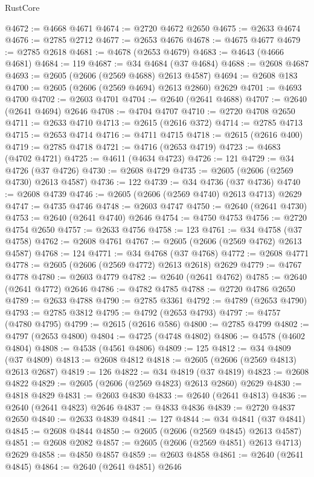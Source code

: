 \begin{lexlean}{RustCore}
\begin{coremodule}
@4672 := @4668 @4671
@4674 := @2720 @4672 @2650
@4675 := @2633 @4674
@4676 := @2785 @2712
@4677 := @2653 @4676
@4678 := @4675 @4677
@4679 := @2785 @2618
@4681 := @4678 (@2653 @4679)
@4683 := @4643 (@4666 @4681)
@4684 := 119
@4687 := @34 @4684 (@37 @4684)
@4688 := @2608 @4687
@4693 := @2605 (@2606 (@2569 @4688) @2613 @4587)
@4694 := @2608 @183
@4700 := @2605 (@2606 (@2569 @4694) @2613 @2860) @2629
@4701 := @4693 @4700
@4702 := @2603 @4701
@4704 := @2640 (@2641 @4688)
@4707 := @2640 (@2641 @4694) @2646
@4708 := @4704 @4707
@4710 := @2720 @4708 @2650
@4711 := @2633 @4710
@4713 := @2615 (@2616 @372)
@4714 := @2785 @4713
@4715 := @2653 @4714
@4716 := @4711 @4715
@4718 := @2615 (@2616 @400)
@4719 := @2785 @4718
@4721 := @4716 (@2653 @4719)
@4723 := @4683 (@4702 @4721)
@4725 := @4611 (@4634 @4723)
@4726 := 121
@4729 := @34 @4726 (@37 @4726)
@4730 := @2608 @4729
@4735 := @2605 (@2606 (@2569 @4730) @2613 @4587)
@4736 := 122
@4739 := @34 @4736 (@37 @4736)
@4740 := @2608 @4739
@4746 := @2605 (@2606 (@2569 @4740) @2613 @4713) @2629
@4747 := @4735 @4746
@4748 := @2603 @4747
@4750 := @2640 (@2641 @4730)
@4753 := @2640 (@2641 @4740) @2646
@4754 := @4750 @4753
@4756 := @2720 @4754 @2650
@4757 := @2633 @4756
@4758 := 123
@4761 := @34 @4758 (@37 @4758)
@4762 := @2608 @4761
@4767 := @2605 (@2606 (@2569 @4762) @2613 @4587)
@4768 := 124
@4771 := @34 @4768 (@37 @4768)
@4772 := @2608 @4771
@4778 := @2605 (@2606 (@2569 @4772) @2613 @2618) @2629
@4779 := @4767 @4778
@4780 := @2603 @4779
@4782 := @2640 (@2641 @4762)
@4785 := @2640 (@2641 @4772) @2646
@4786 := @4782 @4785
@4788 := @2720 @4786 @2650
@4789 := @2633 @4788
@4790 := @2785 @3361
@4792 := @4789 (@2653 @4790)
@4793 := @2785 @3812
@4795 := @4792 (@2653 @4793)
@4797 := @4757 (@4780 @4795)
@4799 := @2615 (@2616 @586)
@4800 := @2785 @4799
@4802 := @4797 (@2653 @4800)
@4804 := @4725 (@4748 @4802)
@4806 := @4578 (@4602 @4804)
@4808 := @4538 (@4561 @4806)
@4809 := 125
@4812 := @34 @4809 (@37 @4809)
@4813 := @2608 @4812
@4818 := @2605 (@2606 (@2569 @4813) @2613 @2687)
@4819 := 126
@4822 := @34 @4819 (@37 @4819)
@4823 := @2608 @4822
@4829 := @2605 (@2606 (@2569 @4823) @2613 @2860) @2629
@4830 := @4818 @4829
@4831 := @2603 @4830
@4833 := @2640 (@2641 @4813)
@4836 := @2640 (@2641 @4823) @2646
@4837 := @4833 @4836
@4839 := @2720 @4837 @2650
@4840 := @2633 @4839
@4841 := 127
@4844 := @34 @4841 (@37 @4841)
@4845 := @2608 @4844
@4850 := @2605 (@2606 (@2569 @4845) @2613 @4587)
@4851 := @2608 @2082
@4857 := @2605 (@2606 (@2569 @4851) @2613 @4713) @2629
@4858 := @4850 @4857
@4859 := @2603 @4858
@4861 := @2640 (@2641 @4845)
@4864 := @2640 (@2641 @4851) @2646

\end{coremodule}
\end{lexlean}
